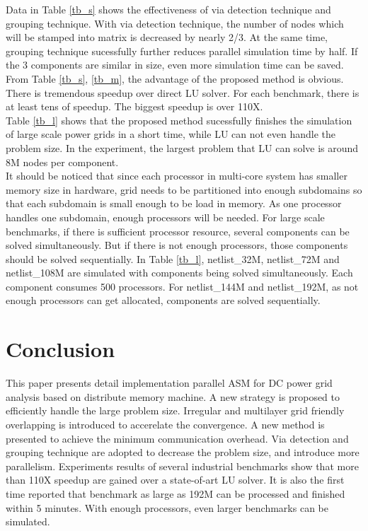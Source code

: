 \documentclass{sig-alternate}
\begin{document}
	Data in Table \ref{tb_s} shows the effectiveness of via detection technique and grouping technique. With via detection 
	technique, the 
	number of nodes which will be stamped into matrix is decreased by nearly 2/3. At the same time, grouping technique sucessfully
	further reduces parallel simulation time by half. If the 3 components are similar in size, even more simulation time can be
	saved.\\

	From Table \ref{tb_s}, \ref{tb_m}, the advantage of the proposed method is obvious. There is tremendous 
	speedup over direct LU solver. For each benchmark, there is at least tens of speedup. The biggest speedup is over 110X.\\ 

	Table \ref{tb_l} shows that the proposed method sucessfully finishes the simulation of large scale power grids
	in a short time, while LU can not even handle the problem size. In the experiment, the largest problem that LU can solve is 
	around 8M nodes per component.\\ 

	It should be noticed that since each processor in multi-core system has smaller memory size in hardware, grid needs to be 
	partitioned into enough subdomains so that each subdomain is small enough to be load in memory. As one processor handles one 
	subdomain, enough processors will be needed. For large scale benchmarks, if there is sufficient processor resource, several 
	components can be solved simultaneously. But if there is not enough processors, those components should be 
	solved sequentially. In Table \ref{tb_l}, netlist\_32M, netlist\_72M and netlist\_108M are 
	simulated with components being solved simultaneously. Each component consumes 500 processors. For netlist\_144M and 
	netlist\_192M, as not enough processors can get allocated, components are solved sequentially.\\

\section{Conclusion}
	This paper presents detail implementation parallel ASM for DC power grid analysis based on distribute memory machine. 
	A new strategy is proposed to efficiently handle the large problem size. Irregular and multilayer grid friendly overlapping 
	is introduced to accerelate the convergence. A new method is presented to achieve the minimum communication overhead. Via 
	detection and grouping technique are adopted to decrease the problem size, and introduce more parallelism. Experiments 
	results of several industrial benchmarks show that more than 110X speedup are gained over a state-of-art LU solver. It is also 
	the first time reported that benchmark as large as 192M can be processed and finished within 5 minutes. With enough processors, 
	even larger benchmarks can be simulated.




\end{document}
